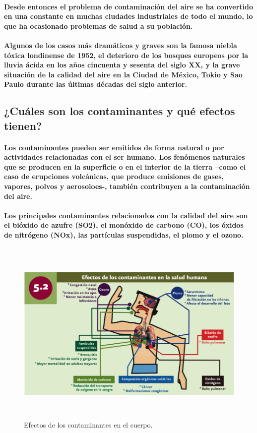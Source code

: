     \paragraph {Desde entonces el problema de contaminación del aire se ha convertido en una constante en muchas ciudades industriales de todo el mundo, lo que ha ocasionado problemas de salud a su población.}

    \paragraph {Algunos de los casos más dramáticos y graves son la famosa niebla tóxica londinense de 1952, el deterioro de los bosques europeos por la lluvia ácida en los años cincuenta y sesenta del siglo XX, y la grave situación de la calidad del aire en la Ciudad de México, Tokio y Sao Paulo durante las últimas décadas del siglo anterior. }

  \subsection {¿Cuáles son los contaminantes y qué efectos tienen?}
    \paragraph {Los contaminantes pueden ser emitidos de forma natural o por actividades relacionadas con el ser humano. Los fenómenos naturales que se producen en la superficie o  en el interior de la tierra –como el caso de erupciones volcánicas, que produce emisiones de gases, vapores, polvos y aerosoloes-, también contribuyen a la contaminación del aire.}
    
    \paragraph {Los principales contaminantes relacionados con la calidad del aire son el bióxido de azufre (SO2), el monóxido de carbono (CO), los óxidos  de nitrógeno (NOx), las partículas suspendidas, el plomo y el ozono.}
  
    \begin{figure}[h!]
      \centering
       \includegraphics[width=12.5cm,height=9cm]{./images/1.png}
       \caption{Efectos de los contaminantes en el cuerpo.}
    \end{figure}

